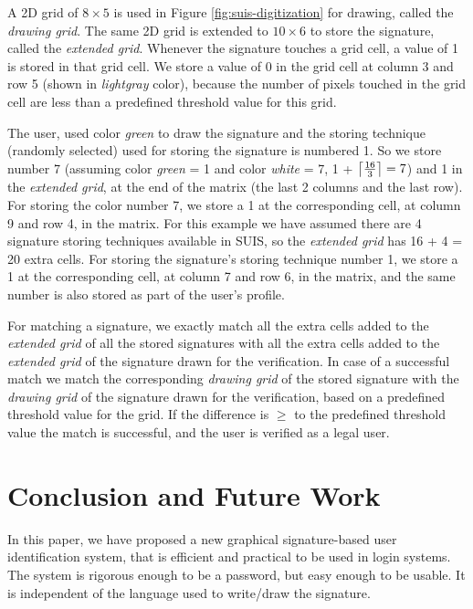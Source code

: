 \documentclass[conference]{IEEEtran}
\DeclarePairedDelimiter\ceil{\lceil}{\rceil}
\begin{document}
A 2D grid of $8 \times 5$ is used in Figure \ref{fig:suis-digitization} for drawing, called the \emph{drawing grid}. The same 2D grid is extended to $10 \times 6$ to store the signature, called the \emph{extended grid}. Whenever the signature touches a grid cell, a value of 1 is stored in that grid cell. We store a value of 0 in the grid cell at column 3 and row 5 (shown in \emph{lightgray} color), because the number of pixels touched in the grid cell are less than a predefined threshold value for this grid.

The user, used color \emph{green} to draw the signature and the storing technique (randomly selected) used for storing the signature is numbered 1. So we store number 7 (assuming color \emph{green} = 1 and color \emph{white} = 7, 1 + $\ceil*{\frac{16}{3}} = 7$) and 1 in the \emph{extended grid}, at the end of the matrix (the last 2 columns and the last row). For storing the color number 7, we store a 1 at the corresponding cell, at column 9 and row 4, in the matrix. For this example we have assumed there are 4 signature storing techniques available in SUIS, so the \emph{extended grid} has 16 + 4 = 20 extra cells. For storing the signature's storing technique number 1, we store a 1 at the corresponding cell, at column 7 and row 6, in the matrix, and the same number is also stored as part of the user's profile.

For matching a signature, we exactly match all the extra cells added to the \emph{extended grid} of all the stored signatures with all the extra cells added to the \emph{extended grid} of the signature drawn for the verification. In case of a successful match we match the corresponding \emph{drawing grid} of the stored signature with the \emph{drawing grid} of the signature drawn for the verification, based on a predefined threshold value for the grid. If the difference is $\geq$ to the predefined threshold value the match is successful, and the user is verified as a legal user.











\section{Conclusion and Future Work}\label{sec:conclusion}

In this paper, we have proposed a new graphical signature-based user identification system, that is efficient and practical to be used in login systems. The system is rigorous enough to be a password, but easy enough to be usable. It is independent of the language used to write/draw the signature. 
\end{document}
